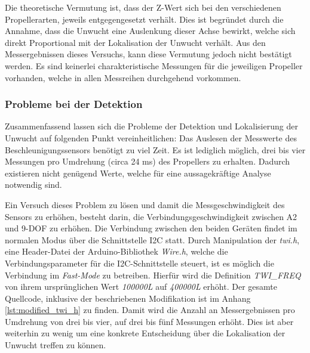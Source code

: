 \begin{table}[H]
\centering
{}
\caption{Messergebnisse mit Unwucht auf Seite ohne Markierung}
\label{tab:imbalance_other_side}
\end{table}

Die theoretische Vermutung ist, dass der Z-Wert sich bei den verschiedenen Propellerarten, jeweils entgegengesetzt verhält.
Dies ist begründet durch die Annahme, dass die Unwucht eine Auslenkung dieser Achse bewirkt, welche sich direkt Proportional mit der Lokalisation der Unwucht verhält.
Aus den Messergebnissen dieses Versuchs, kann diese Vermutung jedoch nicht bestätigt werden.
Es sind keinerlei charakteristische Messungen für die jeweiligen Propeller vorhanden, welche in allen Messreihen durchgehend vorkommen.

\subsubsection*{Probleme bei der Detektion}
Zusammenfassend lassen sich die Probleme der Detektion und Lokalisierung der Unwucht auf folgenden Punkt vereinheitlichen:
Das Auslesen der Messwerte des Beschleunigungssensors benötigt zu viel Zeit.
Es ist lediglich möglich, drei bis vier Messungen pro Umdrehung (circa 24 \ac{ms}) des Propellers zu erhalten.
Dadurch existieren nicht genügend Werte, welche für eine aussagekräftige Analyse notwendig sind.

Ein Versuch dieses Problem zu lösen und damit die Messgeschwindigkeit des Sensors zu erhöhen, besteht darin, die Verbindungsgeschwindigkeit zwischen \ac{A2} und \ac{9-DOF} zu erhöhen.
Die Verbindung zwischen den beiden Geräten findet im normalen Modus über die Schnittstelle \ac{I2C} statt.
Durch Manipulation der \emph{twi.h}, eine Header-Datei der Arduino-Bibliothek \emph{Wire.h}, welche die Verbindungsparameter für die \ac{I2C}-Schnittstelle steuert, ist es möglich die Verbindung im \emph{Fast-Mode} zu betreiben.
Hierfür wird die Definition \emph{TWI\_FREQ} von ihrem ursprünglichen Wert \emph{100000L} auf \emph{400000L} erhöht. Der gesamte Quellcode, inklusive der beschriebenen Modifikation ist im Anhang \ref{lst:modified_twi_h} zu finden.
Damit wird die Anzahl an Messergebnissen pro Umdrehung von drei bis vier, auf drei bis fünf Messungen erhöht.
Dies ist aber weiterhin zu wenig um eine konkrete Entscheidung über die Lokalisation der Unwucht treffen zu können.

